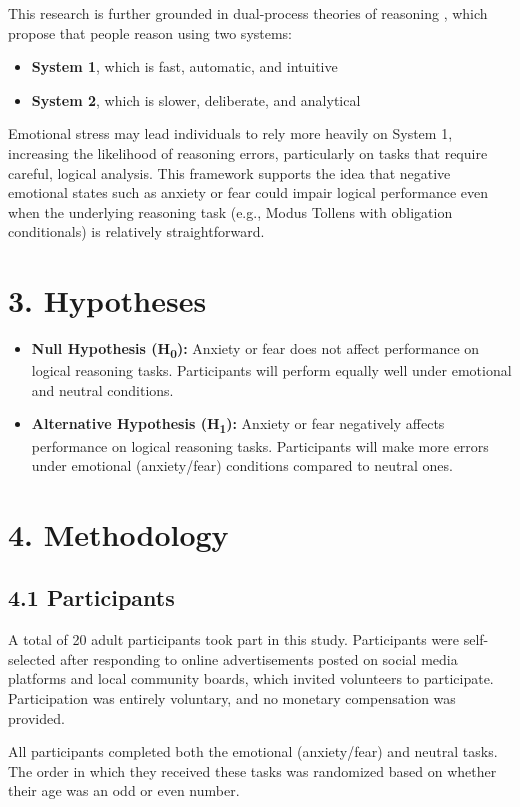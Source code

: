 \documentclass[12pt]{article}
\begin{document}
This research is further grounded in dual-process theories of reasoning \cite{khemlani2018facts}, which propose that people reason using two systems:
\begin{itemize}
    \item \textbf{System 1}, which is fast, automatic, and intuitive
    \item \textbf{System 2}, which is slower, deliberate, and analytical
\end{itemize}
Emotional stress may lead individuals to rely more heavily on System 1, increasing the likelihood of reasoning errors, particularly on tasks that require careful, logical analysis. This framework supports the idea that negative emotional states such as anxiety or fear could impair logical performance even when the underlying reasoning task (e.g., Modus Tollens with obligation conditionals) is relatively straightforward.

\section*{3. Hypotheses}
\begin{itemize}
    \item \textbf{Null Hypothesis (H\textsubscript{0}):} Anxiety or fear does not affect performance on logical reasoning tasks. Participants will perform equally well under emotional and neutral conditions.
    \item \textbf{Alternative Hypothesis (H\textsubscript{1}):} Anxiety or fear negatively affects performance on logical reasoning tasks. Participants will make more errors under emotional (anxiety/fear) conditions compared to neutral ones.
\end{itemize}

\section*{4. Methodology}

\subsection*{4.1 Participants}
A total of 20 adult participants took part in this study. Participants were self-selected after responding to online advertisements posted on social media platforms and local community boards, which invited volunteers to participate. Participation was entirely voluntary, and no monetary compensation was provided.

All participants completed both the emotional (anxiety/fear) and neutral tasks. The order in which they received these tasks was randomized based on whether their age was an odd or even number.
\end{document}
